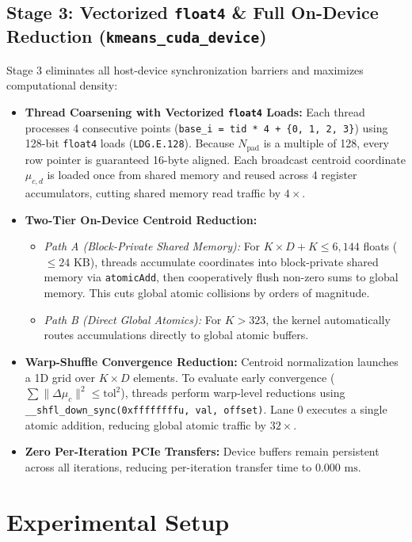 \documentclass[sigconf,nonacm]{acmart}
\begin{document}
\subsection{Stage 3: Vectorized \texttt{float4} \& Full On-Device Reduction (\texttt{kmeans\_cuda\_device})}
Stage 3 eliminates all host-device synchronization barriers and maximizes computational density:
\begin{itemize}
    \item \textbf{Thread Coarsening with Vectorized \texttt{float4} Loads:} Each thread processes 4 consecutive points (\texttt{base\_i = tid * 4 + \{0, 1, 2, 3\}}) using 128-bit \texttt{float4} loads (\texttt{LDG.E.128}). Because $N_{\text{pad}}$ is a multiple of 128, every row pointer is guaranteed 16-byte aligned. Each broadcast centroid coordinate $\mu_{c,d}$ is loaded once from shared memory and reused across 4 register accumulators, cutting shared memory read traffic by \textbf{$4\times$}.
    \item \textbf{Two-Tier On-Device Centroid Reduction:}
    \begin{itemize}
        \item \emph{Path A (Block-Private Shared Memory):} For $K \times D + K \le 6{,}144$ floats ($\le 24\text{ KB}$), threads accumulate coordinates into block-private shared memory via \texttt{atomicAdd}, then cooperatively flush non-zero sums to global memory. This cuts global atomic collisions by orders of magnitude.
        \item \emph{Path B (Direct Global Atomics):} For $K > 323$, the kernel automatically routes accumulations directly to global atomic buffers.
    \end{itemize}
    \item \textbf{Warp-Shuffle Convergence Reduction:} Centroid normalization launches a 1D grid over $K \times D$ elements. To evaluate early convergence ($\sum \|\Delta \mu_c\|^2 \le \text{tol}^2$), threads perform warp-level reductions using \texttt{\_\_shfl\_down\_sync(0xffffffffu, val, offset)}. Lane 0 executes a single atomic addition, reducing global atomic traffic by \textbf{$32\times$}.
    \item \textbf{Zero Per-Iteration PCIe Transfers:} Device buffers remain persistent across all iterations, reducing per-iteration transfer time to \textbf{$0.000\text{ ms}$}.
\end{itemize}

\section{Experimental Setup}
\end{document}
